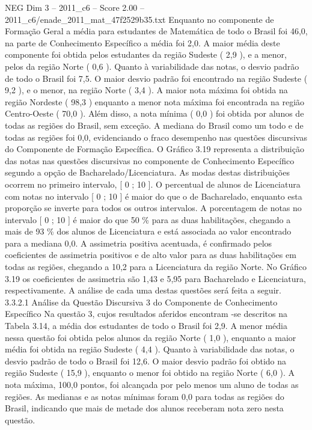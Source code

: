 \begin{textsample}{NEG Dim 3 – 2011\_c6 – Score 2.00 – 2011\_c6/enade\_2011\_mat\_47f2529b35.txt}
Enquanto no componente de Formação Geral a média para estudantes de Matemática de todo o Brasil foi 46,0, na parte de Conhecimento Específico a média foi 2,0.
A maior média deste componente foi obtida pelos estudantes da região Sudeste ( 2,9 ), e a menor, pelos da região Norte ( 0,6 ).
Quanto à variabilidade das notas, o desvio padrão de todo o Brasil foi 7,5.
O maior desvio padrão foi encontrado na região Sudeste ( 9,2 ), e o menor, na região Norte ( 3,4 ).
A maior nota máxima foi obtida na região Nordeste ( 98,3 ) enquanto a menor nota máxima foi encontrada na região Centro-Oeste ( 70,0 ).
Além disso, a nota mínima ( 0,0 ) foi obtida por alunos de todas as regiões do Brasil, sem exceção.
A mediana do Brasil como um todo e de todas as regiões foi 0,0, evidenciando o fraco desempenho nas questões discursivas do Componente de Formação Específica.
O Gráfico 3.19 representa a distribuição das notas nas questões discursivas no componente de Conhecimento Específico segundo a opção de Bacharelado/Licenciatura.
As modas destas distribuições ocorrem no primeiro intervalo, [ 0 ; 10 ].
O percentual de alunos de Licenciatura com notas no intervalo [ 0 ; 10 ] é maior do que o de Bacharelado, enquanto esta proporção se inverte para todos os outros intervalos.
A porcentagem de notas no intervalo [ 0 ; 10 ] é maior do que 50 \% para as duas habilitações, chegando a mais de 93 \% dos alunos de Licenciatura e está associada ao valor encontrado para a mediana 0,0.
A assimetria positiva acentuada, é confirmado pelos coeficientes de assimetria positivos e de alto valor para as duas habilitações em todas as regiões, chegando a 10,2 para a Licenciatura da região Norte.
No Gráfico 3.19 os coeficientes de assimetria são 1,43 e 5,95 para Bacharelado e Licenciatura, respectivamente.
A análise de cada uma destas questões será feita a seguir. 3.3.2.1 Análise da Questão Discursiva 3 do Componente de Conhecimento Específico Na questão 3, cujos resultados aferidos encontram -se descritos na Tabela 3.14, a média dos estudantes de todo o Brasil foi 2,9.
A menor média nessa questão foi obtida pelos alunos da região Norte ( 1,0 ), enquanto a maior média foi obtida na região Sudeste ( 4,4 ).
Quanto à variabilidade das notas, o desvio padrão de todo o Brasil foi 12,6.
O maior desvio padrão foi obtido na região Sudeste ( 15,9 ), enquanto o menor foi obtido na região Norte ( 6,0 ).
A nota máxima, 100,0 pontos, foi alcançada por pelo menos um aluno de todas as regiões.
As medianas e as notas mínimas foram 0,0 para todas as regiões do Brasil, indicando que mais de metade dos alunos receberam nota zero nesta questão.

\end{textsample}
